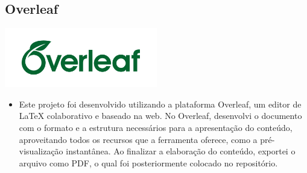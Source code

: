 \documentclass[a4paper,12pt]{article}
\begin{document}
\subsection{Overleaf}
\includegraphics[width=0.5\textwidth]{overleaf.jpg}
    \vspace{1cm}
    \vspace{0.5cm}
    \begin{itemize}
        \item Este projeto foi desenvolvido utilizando a plataforma Overleaf, um editor de LaTeX colaborativo e baseado na web. No Overleaf, desenvolvi o documento com o formato e a estrutura necessários para a apresentação do conteúdo, aproveitando todos os recursos que a ferramenta oferece, como a pré-visualização instantânea. Ao finalizar a elaboração do conteúdo, exportei o arquivo como PDF, o qual foi posteriormente colocado no repositório.
    \end{itemize}
\end{document}
